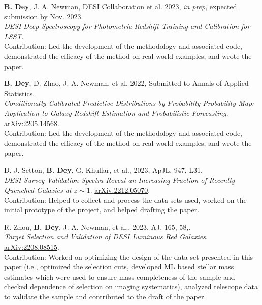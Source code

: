  \begin{etaremune}[leftmargin=40pt,labelsep=10pt]

    \item \textbf{B. Dey}, J. A. Newman, DESI Collaboration et al. 2023, \textit{in prep}, expected submission by Nov. 2023.\\
    \textrm{\textit{DESI Deep Spectroscopy for Photometric Redshift Training and Calibration for LSST}}. %
     \\Contribution: Led the development of the methodology and associated code, demonstrated the efficacy of the method on real-world examples, and wrote the paper.
    
    
    \item \textbf{B. Dey}, D. Zhao, J. A. Newman, et al. 2022, Submitted to Annals of Applied Statistics.\\
    \textrm{\textit{Conditionally Calibrated Predictive Distributions by Probability-Probability Map: Application to Galaxy Redshift Estimation and Probabilistic Forecasting}}.  \href{https://arxiv.org/abs/2205.14568}{arXiv:2205.14568}.
     \\Contribution: Led the development of the methodology and associated code, demonstrated the efficacy of the method on real-world examples, and wrote the paper.
    
    \item D. J. Setton, \textbf{B. Dey}, G. Khullar, et al., 2023, ApJL, 947, L31.\\ \textrm{\textit{DESI Survey Validation Spectra Reveal an Increasing Fraction of Recently Quenched Galaxies at $z\sim 1$}}. \href{https://arxiv.org/abs/2212.05070}{arXiv:2212.05070}.
     \\ Contribution: Helped to collect and process the data sets used, worked on the initial prototype of the project, and helped drafting the paper. 
    
    \item R. Zhou, \textbf{B. Dey}, J. A. Newman, et al., 2023, AJ, 165, 58,.\\ \textrm{\textit{Target Selection and Validation of DESI Luminous Red Galaxies}}. \href{https://arxiv.org/abs/2208.08515}{arXiv:2208.08515}.
     \\ Contribution: Worked on optimizing the design of the data set presented in this paper (i.e., optimized the selection cuts, developed ML based stellar mass estimates which were used to ensure mass completeness of the sample and checked dependence of selection on imaging systematics), analyzed telescope data to validate the sample and contributed to the draft of the paper.
    

\end{etaremune}
